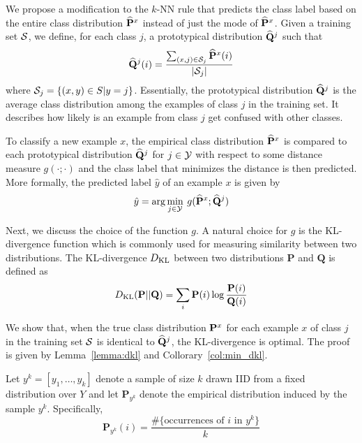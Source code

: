 \documentclass{article}
\begin{document}
We propose a modification to the $k$-NN rule that predicts the class
label based on the entire class distribution $\widehat{\mathbf{P}}^x$ instead of just the
mode of $\widehat{\mathbf{P}}^x$. Given a training set $\mathcal{S}$, we define, for each
class $j$, a prototypical distribution $\widehat{\mathbf{Q}}^j$ such that
\[
\widehat{\mathbf{Q}}^j(i) = \frac{\sum_{(x,j) \in \mathcal{S}_j} \widehat{\mathbf{P}}^x(i)}{|\mathcal{S}_j|}
\]
where $\mathcal{S}_j = \{ (x,y) \in S | y = j \}$. Essentially, the prototypical
distribution $\widehat{\mathbf{Q}}^j$ is the average class distribution among the
examples of class $j$ in the training set. It describes how likely is
an example from class $j$ get confused with other classes.

To classify a new example $x$, the empirical class distribution
$\widehat{\mathbf{P}}^x$ is compared to each prototypical distribution $\widehat{\mathbf{Q}}^j$ for $j
\in \mathcal{Y}$ with respect to some distance measure $g(\cdot ; \cdot)$ and
the class label that minimizes the distance is then predicted. More
formally, the predicted label $\hat{y}$ of an example $x$ is given by
\[
\hat{y} = \arg\min_{j \in \mathcal{Y}} \: g(\widehat{\mathbf{P}}^x ; \widehat{\mathbf{Q}}^j)
\]

Next, we discuss the choice of the function $g$. A natural choice for
$g$ is the KL-divergence function which is commonly used for measuring
similarity between two distributions. The KL-divergence $D_{\mathrm{KL}}$ between
two distributions $\mathbf{P}$ and $\mathbf{Q}$ is defined as
\[
D_{\mathrm{KL}}(\mathbf{P} || \mathbf{Q}) = \sum_i \mathbf{P}(i) \log \frac{\mathbf{P}(i)}{\mathbf{Q}(i)}
\]

We show that, when the true class distribution $\mathbf{P}^x$ for each
example $x$ of class $j$ in the training set $\mathcal{S}$ is identical
to $\widehat{\mathbf{Q}}^j$, the KL-divergence is optimal. The proof is
given by Lemma~\ref{lemma:dkl} and Collorary~\ref{col:min_dkl}. 

\newcommand{\sampleYK}{y^k}
\newcommand{\sampleEmpDist}{\mathbf{P}_{y^k}}
\newcommand{\Q}{\mathbf{Q}}

Let $\sampleYK = [y_1, \ldots, y_k]$ denote a sample of size $k$ drawn IID
from a fixed distribution over $Y$ and let $\sampleEmpDist$ denote the
empirical distribution induced by the sample
$\sampleYK$. Specifically,
\[
\sampleEmpDist(i) = \frac{\#\{ \mbox{occurrences of } i \mbox{ in } y^k\}}{k}
\]
\end{document}
